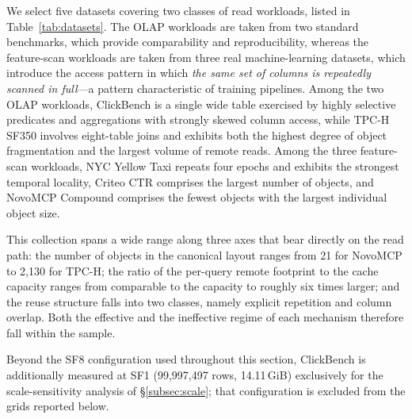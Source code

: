 We select five datasets covering two classes of read workloads, listed in
Table~\ref{tab:datasets}. The OLAP workloads are taken from two standard
benchmarks, which provide comparability and reproducibility, whereas the
feature-scan workloads are taken from three real machine-learning datasets,
which introduce the access pattern in which \emph{the same set of columns is
repeatedly scanned in full}---a pattern characteristic of training pipelines.
Among the two OLAP workloads, ClickBench is a single wide table exercised by
highly selective predicates and aggregations with strongly skewed column
access, while TPC-H SF350 involves eight-table joins and exhibits both the
highest degree of object fragmentation and the largest volume of remote reads.
Among the three feature-scan workloads, NYC Yellow Taxi repeats four epochs and
exhibits the strongest temporal locality, Criteo CTR comprises the largest
number of objects, and NovoMCP Compound comprises the fewest objects with the
largest individual object size.

This collection spans a wide range along three axes that bear directly on the
read path: the number of objects in the canonical layout ranges from 21 for
NovoMCP to 2{,}130 for TPC-H; the ratio of the per-query remote footprint to
the cache capacity ranges from comparable to the capacity to roughly six times
larger; and the reuse structure falls into two classes, namely explicit
repetition and column overlap. Both the effective and the ineffective regime of
each mechanism therefore fall within the sample.

Beyond the SF8 configuration used throughout this section, ClickBench is
additionally measured at SF1 (99{,}997{,}497 rows, 14.11\,GiB) exclusively for
the scale-sensitivity analysis of \S\ref{subsec:scale}; that configuration is
excluded from the grids reported below.


